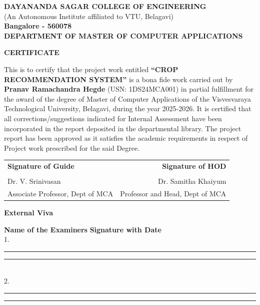 \documentclass[12pt,a4paper]{report}
\begin{document}
\newpage
\thispagestyle{empty}
\begin{center}
    \textbf{\Large DAYANANDA SAGAR COLLEGE OF ENGINEERING}\\
    (An Autonomous Institute affiliated to VTU, Belagavi)\\
    \textbf{Bangalore - 560078} \\
    \vspace{1cm}
    \textbf{\Large DEPARTMENT OF MASTER OF COMPUTER APPLICATIONS} \\
    \vspace{1cm}
    \fbox{\begin{minipage}{2cm} \vspace{1.5cm} \centering [Logo] \end{minipage}}
    
    \vspace{0.5cm}
    \textbf{\Large CERTIFICATE}
\end{center}

\vspace{0.5cm}
\noindent This is to certify that the project work entitled \textbf{``CROP RECOMMENDATION SYSTEM''} is a bona fide work carried out by \textbf{Pranav Ramachandra Hegde} (USN: 1DS24MCA001) in partial fulfillment for the award of the degree of Master of Computer Applications of the Visvesvaraya Technological University, Belagavi, during the year 2025-2026. It is certified that all corrections/suggestions indicated for Internal Assessment have been incorporated in the report deposited in the departmental library. The project report has been approved as it satisfies the academic requirements in respect of Project work prescribed for the said Degree.

\vspace{3cm}

\noindent
\begin{tabular}{lr}
    \textbf{Signature of Guide} & \hfill \textbf{Signature of HOD} \\
    \\
    Dr. V. Srinivasan & \hfill Dr. Samitha Khaiyum \\
    Associate Professor, Dept of MCA & \hfill Professor and Head, Dept of MCA \\
\end{tabular}

\vspace{2cm}
\begin{center} \textbf{External Viva} \end{center}
\vspace{1cm}
\noindent \textbf{Name of the Examiners} \hfill \textbf{Signature with Date} \\
\vspace{0.5cm}
1. \rule{8cm}{0.5pt} \hfill \rule{4cm}{0.5pt} \\
\vspace{0.5cm}
2. \rule{8cm}{0.5pt} \hfill \rule{4cm}{0.5pt}
\end{document}
